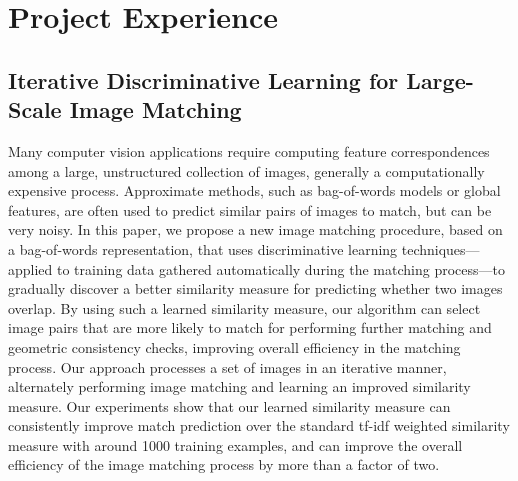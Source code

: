 \documentclass[10pt,letterpaper]{article}
\renewenvironment{itemize}{
  \begin{list}{}{
    \setlength{\leftmargin}{1.5em}
    \setlength{\itemsep}{0.25em}
    \setlength{\parskip}{0pt}
    \setlength{\parsep}{0.25em}
  }
}{
  \end{list}
}
\begin{document}
\section*{Project Experience}
\subsection*{Iterative Discriminative Learning for Large-Scale Image Matching}
\begin{itemize}
\item Many computer vision applications require computing feature correspondences among a large, unstructured collection of images, generally a computationally expensive process.  Approximate methods, such as bag-of-words models or global features, are often used to predict similar pairs of images to match, but can be very noisy.  In this paper, we propose a new image matching procedure, based on a bag-of-words representation, that uses discriminative learning techniques---applied to training data gathered automatically during the matching process---to gradually discover a better similarity measure for predicting whether two images overlap.  By using such a learned similarity measure, our algorithm can select image pairs that are more likely to match for performing further matching and geometric consistency checks, improving overall efficiency in the matching process.  Our approach processes a set of images in an iterative manner, alternately performing image matching and learning an improved similarity measure.  Our experiments show that our learned similarity measure can consistently improve match prediction over the standard tf-idf weighted similarity measure with around 1000 training examples, and can improve the overall efficiency of the image matching process by more than a factor of two.
\end{itemize}
\end{document}
